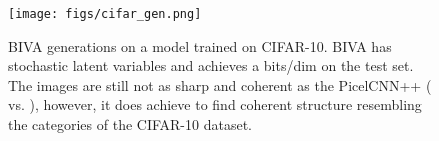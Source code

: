\documentclass{article}
\def\nm{BIVA\xspace}
\begin{document}
\begin{figure}[!h]
\centering
\texttt{[image: figs/cifar\_gen.png]}
\caption{\nm  generations on a model trained on CIFAR-10. \nm has  stochastic latent variables and achieves a  bits/dim on the test set. The images are still not as sharp and coherent as the PicelCNN++ \citep{Salimans17} ( vs. ), however, it does achieve to find coherent structure resembling the categories of the CIFAR-10 dataset.}
\end{figure}
\end{document}
